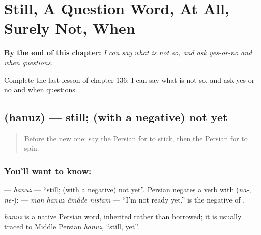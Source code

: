 
\chapter{Still, A Question Word, At All, Surely Not, When}
\label{ch:fa-still-a-question-word-at-all-surely-not-when}

\begin{chapteropening}
\textbf{By the end of this chapter:} \emph{I can say what is not so, and ask yes-or-no and when questions.}

Complete the last lesson of chapter 136: I can say what is not so, and ask yes-or-no and when questions.
\end{chapteropening}

\section[\texorpdfstring{\fa{هنوز} (hanuz)}{هنوز (hanuz)}]{ (hanuz) — still; (with a negative) not yet}

\label{lesson:FA-C136-hanuz}



\begin{quote}
Before the new one: say the Persian for to stick, then the Persian for to spin.
\end{quote}

\subsection*{You'll want to know: }
\textbf{} — \emph{hanuz} — \textquotedblleft{}still; (with a negative) not yet\textquotedblright{}. Persian negates a verb with \textbf{} (\emph{na-}, \emph{ne-}): \textbf{   } — \emph{man hanuz âmâde nistam} — \textquotedblleft{}I'm not ready yet.\textquotedblright{} \textbf{} is the negative of \textbf{}.

\begin{cousinweb}
\emph{hanuz} is a native Persian word, inherited rather than borrowed; it is usually traced to Middle Persian \emph{hanūz}, \textquotedblleft{}still, yet\textquotedblright{}.
\end{cousinweb}

